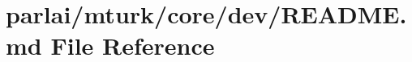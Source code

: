 \hypertarget{parlai_2mturk_2core_2dev_2README_8md}{}\section{parlai/mturk/core/dev/\+R\+E\+A\+D\+ME.md File Reference}
\label{parlai_2mturk_2core_2dev_2README_8md}
